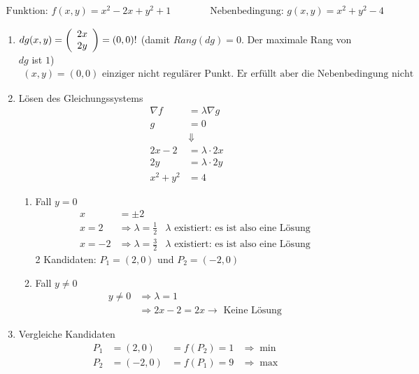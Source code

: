 \documentclass[a4paper]{article}
\begin{document}
		\begin{fmerke}
			\begin{align*}
				\text{Funktion: } f(x,y) = x^2 - 2x + y^2 +1 \qquad \qquad	\text{Nebenbedingung: } g(x,y) = x^2+y^2 -4
			\end{align*}
			\begin{enumerate}
				\item $dg(x,y) = \left( \begin{array}{c} 2x \\ 2y \end{array} \right) = (0,0)!$ (damit $Rang(dg)=0$. Der maximale Rang von $dg$ ist $1$)
					\begin{align*}
						(x,y) = (0,0) \text{ einziger nicht regulärer Punkt. Er erfüllt aber die Nebenbedingung nicht und ist daher kein Kandidat.}
					\end{align*}
				\item Lösen des Gleichungssystems
					  \begin{align*}
				      	\nabla f &= \lambda \nabla g\\
				      	g &= 0\\
				      	&\Downarrow\\
				      	2x -2 &= \lambda \cdot 2x \\
				      	2y &= \lambda \cdot 2y\\
				      	x^2+y^2 &= 4
				      \end{align*}
					\begin{enumerate}
						\item Fall $y = 0$
							\begin{align*}
								x &= \pm 2\\
								x = 2 &\Longrightarrow \lambda = \frac{1}{2} &\text{$\lambda$ existiert: es ist also eine Lösung}\\
								x = -2 &\Longrightarrow \lambda = \frac{3}{2}&\text{$\lambda$ existiert: es ist also eine Lösung}
							\end{align*}
							2 Kandidaten: $P_1 = (2,0)$ und $P_2 = (-2,0)$
							
						\item Fall $y \neq 0$
							\begin{align*}
								y \neq 0 &\Longrightarrow \lambda = 1\\
										 &\Longrightarrow 2x -2 =2x \rightarrow \text{ Keine Lösung}
							\end{align*}
					\end{enumerate}
				\item Vergleiche Kandidaten
					\begin{align*}
						P_1 &= (2,0) &= f(P_2) =1  &\Rightarrow \min\\
						P_2 &= (-2,0)&= f(P_1) = 9 &\Rightarrow \max
					\end{align*}

			\end{enumerate}


		\end{fmerke}
	\newpage
\end{document}
